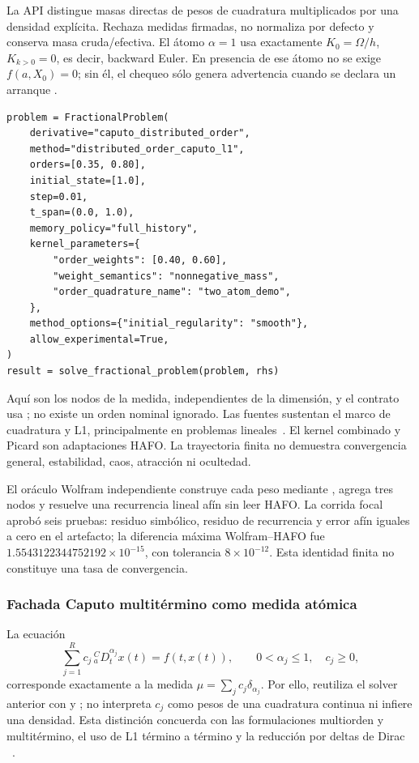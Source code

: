 La API distingue masas directas de pesos de cuadratura multiplicados por una
densidad explícita. Rechaza medidas firmadas, no normaliza por defecto y conserva
masa cruda/efectiva. El átomo \(\alpha=1\) usa exactamente
\(K_0=\Omega/h\), \(K_{k>0}=0\), es decir, backward Euler. En presencia de ese
átomo no se exige \(f(a,X_0)=0\); sin él, el chequeo sólo genera advertencia
cuando se declara un arranque .

\begin{verbatim}
problem = FractionalProblem(
    derivative="caputo_distributed_order",
    method="distributed_order_caputo_l1",
    orders=[0.35, 0.80],
    initial_state=[1.0],
    step=0.01,
    t_span=(0.0, 1.0),
    memory_policy="full_history",
    kernel_parameters={
        "order_weights": [0.40, 0.60],
        "weight_semantics": "nonnegative_mass",
        "order_quadrature_name": "two_atom_demo",
    },
    method_options={"initial_regularity": "smooth"},
    allow_experimental=True,
)
result = solve_fractional_problem(problem, rhs)
\end{verbatim}

Aquí  son los nodos de la medida, independientes de la dimensión,
y el contrato usa ; no existe un orden nominal
ignorado. Las fuentes sustentan el marco de cuadratura y L1, principalmente en
problemas lineales~\cite{CaputoDistributed2001,DiethelmFord2009,HuEtAl2014Distributed,LinXu2007L1}.
El kernel combinado y Picard son adaptaciones HAFO. La trayectoria finita no
demuestra convergencia general, estabilidad, caos, atracción ni ocultedad.

El oráculo Wolfram independiente construye cada peso mediante
, agrega tres nodos y resuelve una recurrencia lineal afín
sin leer HAFO. La corrida focal aprobó seis pruebas: residuo simbólico, residuo
de recurrencia y error afín iguales a cero en el artefacto; la diferencia máxima
Wolfram--HAFO fue \(1.5543122344752192\times10^{-15}\), con tolerancia
\(8\times10^{-12}\). Esta identidad finita no constituye una tasa de
convergencia.

\subsubsection{Fachada Caputo multitérmino como medida atómica}

La ecuación
\[
 \sum_{j=1}^{R}c_j\,{}_a^CD_t^{\alpha_j}x(t)=f(t,x(t)),
 \qquad 0<\alpha_j\le1,\quad c_j\ge0,
\]
corresponde exactamente a la medida
\(
\mu=\sum_jc_j\delta_{\alpha_j}
\).
Por ello,  reutiliza el solver anterior
con  y ; no interpreta
\(c_j\) como pesos de una cuadratura continua ni infiere una densidad. Esta
distinción concuerda con las formulaciones multiorden y multitérmino, el uso de
L1 término a término y la reducción por deltas de Dirac
~\cite{DiethelmFord2004MultiOrder,RenSun2014MultiTerm,SheLiSun2022TransformedL1,ZakyMachado2020Atomic}.

